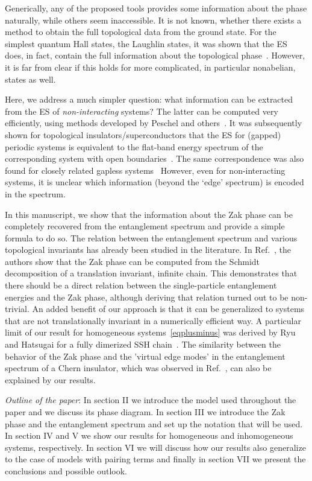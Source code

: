 \documentclass[twocolumn,amsmath,longbibliography,amssymb,superscriptaddress]{revtex4-1}
\begin{document}
Generically, any of the proposed tools provides some information about the phase naturally, while others seem inaccessible. 
It is not known, whether there exists a method to obtain the full topological data from the ground state. 
For the simplest quantum Hall states, the Laughlin states,  it was shown that the ES does, in fact, contain the full information about the topological phase~\cite{hermanns2011haldane}.
However, it is far from clear if this holds for more complicated, in particular nonabelian, states as well.  

Here, we address a much simpler question: what information can be extracted from the ES of \emph{non-interacting} systems?
The latter can be computed very efficiently, using methods developed by Peschel and others~\cite{Peschel2003}. 
It was subsequently shown for topological insulators/superconductors that the ES for (gapped) periodic systems is equivalent to the flat-band energy spectrum of the corresponding system with open boundaries~\cite{Fidkowski2010entanglement}. 
The same correspondence was also found for closely related gapless systems~\cite{Matern2018entanglement}
However, even for non-interacting systems, it is unclear which information (beyond the  `edge' spectrum) is encoded in the spectrum. 

In this manuscript, we show that the information about the Zak phase can be completely recovered from the entanglement spectrum and provide a simple formula to do so. 
The relation between the entanglement spectrum and various topological invariants has already been studied in the literature. 
In Ref.~\cite{Zaletel2014}, the authors show that the Zak phase can be computed from the Schmidt decomposition of a translation invariant, infinite chain. 
This demonstrates that there should be a direct relation between the single-particle entanglement energies and the Zak phase, although deriving that relation turned out to be non-trivial. 
An added benefit of our approach is that it can be generalized to systems that are not translationally invariant in a numerically efficient way. 
A particular limit of our result for homogeneous systems~\ref{eqplusminus} was derived by Ryu and Hatsugai for a fully dimerized SSH chain~\cite{Ryu2006}. 
The similarity between the behavior of the Zak phase and the 'virtual edge modes' in the entanglement spectrum of a Chern insulator, which was observed in Ref.~\cite{Huang2012,Huang2012-2}, can also be explained by our results. 


\emph{Outline of the paper}: In section II we introduce the model used throughout the paper and we discuss its phase diagram. In section III we introduce the Zak phase and the entanglement spectrum and set up the notation that will be used. In section IV and V we show our results for homogeneous and inhomogeneous systems, respectively. In section VI we will discuss how our results also generalize to the case of models with pairing terms and finally in section VII we present the conclusions and possible outlook.
\end{document}
